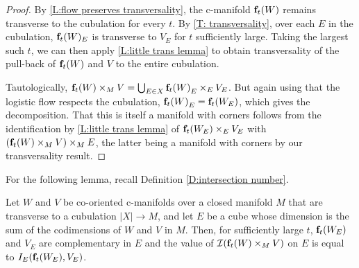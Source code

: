 \begin{proof}
	By \cref{L:flow preserves transversality}, the c-manifold $\mathbf{f}_t(W)$ remains transverse to the cubulation for every $t$.
	By \cref{T: transversality}, over each $E$ in the cubulation, $\mathbf{f}_t(W)_E$ is transverse to $V_E$ for $t$ sufficiently large.
	Taking the largest
	such $t$, we can then apply \cref{L:little trans lemma} to obtain transversality of the pull-back of $\mathbf{f}_t(W)$ and $V$ to the entire cubulation.

	Tautologically, $ \mathbf{f}_t(W) \times_M V = \bigcup_{E \in X} {\mathbf{f}_t(W)}_E \times_E V_E$.
	But again using that the logistic flow respects the cubulation, ${\mathbf{f}_t(W)}_E = {\mathbf{f}_t(W_E)}$, which gives the decomposition.
	That this is itself a manifold with corners follows from the identification by \cref{L:little trans lemma} of $ {\mathbf{f}_t(W_E)} \times_E V_E$ with $(\mathbf{f}_t(W) \times_M V)\times_M E$, the latter being a manifold with corners by our transversality result.
\end{proof}

For the following lemma, recall Definition \ref{D:intersection number}.

\begin{lemma}\label{L:intersection signs}
	Let $W$ and $V$ be co-oriented c-manifolds over a closed manifold $M$ that are transverse to a cubulation $|X| \to M$, and let $E$ be a cube whose dimension
	is the sum of the codimensions of $W$ and $V$ in $M$.
	Then, for sufficiently large $t$, $\mathbf{f}_t(W_E)$ and $V_E$ are complementary in $E$ and the value of $\mathcal{I}(\mathbf{f}_t(W) \times_M V)$ on $E$
	is equal to $I_E(\mathbf{f}_t(W_E), V_E)$.
\end{lemma}

